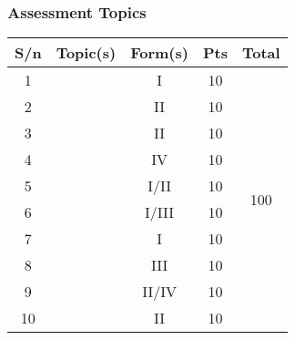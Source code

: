 \subsubsection{Assessment Topics}
\begin{center}
\begin{tabular}{cl|c|c|c|} \\ \hline
\multicolumn{1}{|c|}{\textbf{S\slash n}} & \multicolumn{1}{c|}{\textbf{Topic(s)}} & \textbf{Form(s)} & \textbf{Pts} & \textbf{Total} \\ \hline \hline
\multicolumn{1}{|c|}{1} &  & I & 10 & \multirow{10}{*}{100} \\ \cline{1-4}
\multicolumn{1}{|c|}{2} &  & II & 10 & \\ \cline{1-4}
\multicolumn{1}{|c|}{3} &  & II & 10 & \\ \cline{1-4}
\multicolumn{1}{|c|}{4} &  & IV & 10 & \\ \cline{1-4}
\multicolumn{1}{|c|}{5} &  & I\slash II & 10 & \\ \cline{1-4}
\multicolumn{1}{|c|}{6} &  & I\slash III & 10 & \\ \cline{1-4}
\multicolumn{1}{|c|}{7} &  & I & 10 & \\ \cline{1-4}
\multicolumn{1}{|c|}{8} &  & III & 10 & \\ \cline{1-4}
\multicolumn{1}{|c|}{9} &  & II\slash IV & 10 & \\ \cline{1-4}
\multicolumn{1}{|c|}{10} &  & II & 10 & \\ \hline
\end{tabular}
\end{center}

